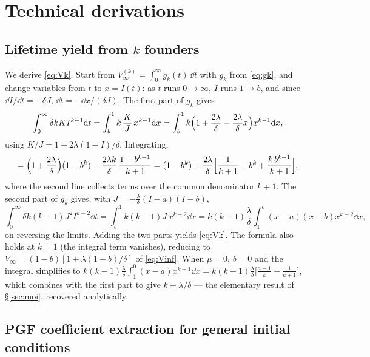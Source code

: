 
\section{Technical derivations}
\label{app:technical}

\subsection{Lifetime yield from $k$ founders}
\label{app:Vk}

We derive \eqref{eq:Vk}. Start from
$V_\infty^{(k)}=\int_0^\infty g_k(t)\,\dd t$ with $g_k$ from
\eqref{eq:gk}, and change variables from $t$ to $x=I(t)$: as $t$ runs
$0\to\infty$, $I$ runs $1\to b$, and since $\dd I/\dd t=-\delta J$,
$\dd t=-\dd x/(\delta J)$. The first part of $g_k$ gives
$$
\int_0^\infty\delta k K I^{k-1}{\rm d} t
=\int_b^1 k\,\frac{K}{J}\,x^{k-1}{\rm d} x
=\int_b^1 k\Bigl(1+\frac{2\lambda}{\delta}-\frac{2\lambda}{\delta}x\Bigr)
x^{k-1}{\rm d} x,
$$
using $K/J=1+2\lambda(1-I)/\delta$. Integrating,
$$
=\Bigl(1+\frac{2\lambda}{\delta}\Bigr)(1-b^k)
-\frac{2\lambda k}{\delta}\,\frac{1-b^{k+1}}{k+1}
=(1-b^k)+\frac{2\lambda}{\delta}
\Bigl[\frac{1}{k+1}-b^k+\frac{k\,b^{k+1}}{k+1}\Bigr],
$$
where the second line collects terms over the common denominator $k+1$.
The second part of $g_k$ gives, with
$J=-\frac{\lambda}{\delta}(I-a)(I-b)$,
$$
\int_0^\infty\delta k(k-1)J^2 I^{k-2}\dd t
=\int_b^1 k(k-1)J\,x^{k-2}\dd x
=k(k-1)\frac{\lambda}{\delta}\int_1^b (x-a)(x-b)x^{k-2}\dd x,
$$
on reversing the limits. Adding the two parts yields \eqref{eq:Vk}. The
formula also holds at $k=1$ (the integral term vanishes), reducing to
$V_\infty=(1-b)[1+\lambda(1-b)/\delta]$ of \eqref{eq:Vinf}. When $\mu=0$,
$b=0$ and the integral simplifies to
$k(k-1)\frac{\lambda}{\delta}\int_1^0(x-a)x^{k-1}\dd x
=k(k-1)\frac{\lambda}{\delta}\bigl[\frac{a-1}{k}-\frac{1}{k+1}\bigr]$,
which combines with the first part to give $k+\lambda/\delta$ --- the
elementary result of \S\ref{sec:moi}, recovered analytically.

\subsection{PGF coefficient extraction for general initial conditions}
\label{app:pgf-extract}

